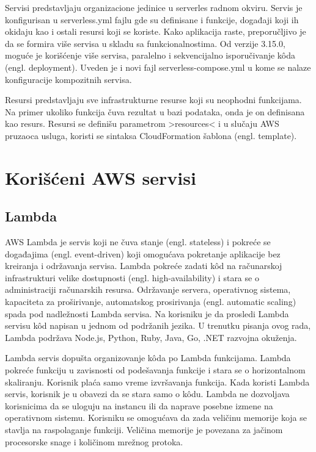 \documentclass[12pt,oneside]{memoir}
\begin{document}
Servisi predstavljaju organizacione jedinice u serverles radnom okviru. Servis je konfigurisan u serverless.yml fajlu gde su definisane i funkcije, događaji koji ih okidaju kao i ostali resursi koji se koriste. Kako aplikacija raste, preporučljivo je da se formira više servisa u skladu sa funkcionalnostima\cite{sfs}. Od verzije 3.15.0, moguće je korišćenje više servisa, paralelno i sekvencijalno isporučivanje kôda (engl. deployment). Uveden je i novi fajl serverless-compose.yml u kome se nalaze konfiguracije kompozitnih servisa.
 
Resursi predstavljaju sve infrastrukturne resurse koji su neophodni funkcijama. Na primer ukoliko funkcija čuva rezultat u bazi podataka, onda je on definisana kao resurs. Resursi se definišu parametrom >resources< i u slučaju AWS pruzaoca usluga, koristi se sintaksa CloudFormation šablona (engl. template).

\section{Korišćeni AWS servisi}
\subsection{Lambda}
 
AWS Lambda je servis koji ne čuva stanje (engl. stateless) i pokreće se događajima (engl. event-driven) koji omogućava pokretanje aplikacije bez kreiranja i održavanja servisa. Lambda pokreće zadati kôd na računarskoj infrastrukturi velike dostupnosti (engl. high-availability) i stara se o administraciji računarskih resursa. Održavanje servera, operativnog sistema, kapaciteta za proširivanje, automatskog prosirivanja (engl. automatic scaling) spada pod nadležnosti Lambda servisa. Na korisniku je da prosledi Lambda servisu kôd napisan u jednom od podržanih jezika. U trenutku pisanja ovog rada, Lambda podržava Node.js, Python, Ruby, Java, Go, .NET razvojna okuženja\cite{lr}.
 
Lambda servis dopušta organizovanje kôda po Lambda funkcijama. Lambda pokreće funkciju u zavisnosti od podešavanja funkcije i stara se o horizontalnom skaliranju. Korisnik plaća samo vreme izvršavanja funkcija. Kada koristi Lambda servis, korisnik je u obavezi da se stara samo o kôdu. Lambda ne dozvoljava korisnicima da se uloguju na instancu ili da naprave posebne izmene na operativnom sistemu. Korisniku se omogućava da zada veličinu memorije koja se stavlja na raspolaganje funkciji. Veličina memorije je povezana za jačinom procesorske snage i količinom mrežnog protoka.
 
\end{document}

